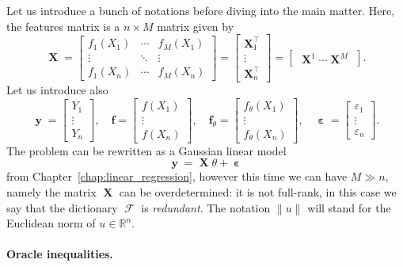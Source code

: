 \documentclass[
	fontsize=11pt, %
	twoside=false, %
	numbers=noenddot, %
]{kaobook}
\DeclareMathOperator{\cF}{{\mathcal F}}
\DeclareMathOperator{\bX}{{\boldsymbol X}}
\renewcommand{\bf}{{\boldsymbol f}}
\DeclareMathOperator{\by}{{\boldsymbol y}}
\DeclareMathOperator{\beps}{\boldsymbol \varepsilon}
\newcommand{\eps}{\varepsilon}
\newcommand{\R}{\mathbb R}
\newcommand{\norm}[1]{\| #1 \|}
\begin{document}
Let us introduce a bunch of notations before diving into the main matter.
Here, the features matrix is a $n \times M$ matrix given by
\begin{equation*}
	\bX = 
	\begin{bmatrix}
		f_1(X_1) & \cdots & f_M(X_1) \\
		\vdots & \ddots & \vdots \\
		f_1(X_n) & \cdots & f_M(X_n)
	\end{bmatrix}	
	=
	\begin{bmatrix}
		\bX_1^\top \\
		\vdots \\
		\bX_n^\top 
	\end{bmatrix}
	= 
	\begin{bmatrix}
		\bX^1 \cdots \bX^M
	\end{bmatrix}.
\end{equation*}
Let us introduce also
\begin{equation*}
	\by =
	\begin{bmatrix}
		Y_1 \\
		\vdots \\
		Y_n
	\end{bmatrix},
	\quad
	\bf = 
	\begin{bmatrix}
		f(X_1) \\
		\vdots \\
		f(X_n)
	\end{bmatrix},
	\quad
	\bf_\theta =	
	\begin{bmatrix}
		f_\theta(X_1) \\
		\vdots \\
		f_\theta(X_n)
	\end{bmatrix},
	\quad
	\beps = 
	\begin{bmatrix}
		\eps_1 \\
		\vdots \\
		\eps_n
	\end{bmatrix}.
\end{equation*}
The problem can be rewritten as a Gaussian linear model
\begin{equation*}
	\by = \bX \theta + \beps
\end{equation*}
from Chapter~\ref{chap:linear_regression}, however this time we can have $M \gg n$, namely the matrix $\bX$ can be overdetermined: it is not full-rank, in this case we say that the dictionary $\cF$ is \emph{redundant}.
The notation $\norm{u}$ will stand for the Euclidean norm of $u \in \R^n$.

\paragraph{Oracle inequalities.}
\end{document}
